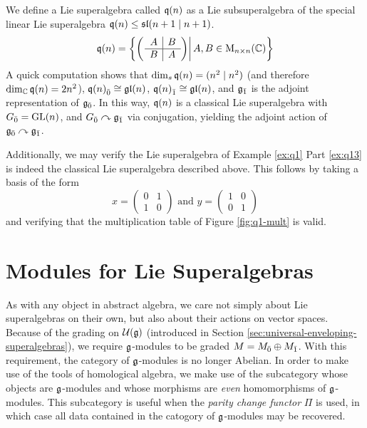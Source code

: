 \begin{example} \label{ex:q(n)}
  We define a Lie superalgebra called $\mathfrak{q}(n)$ as a Lie subsuperalgebra of the special linear Lie superalgebra $\mathfrak{q} (n) \leq \mathfrak{sl}(n+1 \mid n+1)$.
  \[
    \mathfrak{q}(n) =
    \left\{
    \left(
    \left.    
      \begin{array}{c|c}
        A & B \\
        \hline
        B & A
      \end{array}
    \right)
    \right| A,B \in \operatorname{M}_{n \times n}(\mathbb{C})
    \right\}
  \]
  A quick computation shows that $\dim_s \mathfrak{q}(n) = (n^2 \mid n^2)$ (and therefore $\dim_{\mathbb{C}} \mathfrak{q}(n) = 2n^2$), ${\mathfrak{q}(n)}_{\bar{0}} \cong \mathfrak{gl}(n)$, ${\mathfrak{q}(n)}_{\bar{1}} \cong \mathfrak{gl}(n)$, and ${\mathfrak{g}}_{\bar{1}}$ is the adjoint representation of ${\mathfrak{g}}_{\bar{0}}$. In this way, $\mathfrak{q}(n)$ is a classical Lie superalgebra with ${G}_{\bar{0}} = \operatorname{GL}(n)$, and ${G}_{\bar{0}} \curvearrowright {\mathfrak{g}}_{\bar{1}}$ via conjugation, yielding the adjoint action of ${\mathfrak{g}}_{\bar{0}} \curvearrowright {\mathfrak{g}}_{\bar{1}}$.

  Additionally, we may verify the Lie superalgebra of Example \ref{ex:q1} Part \ref{ex:q13} is indeed the classical Lie superalgebra described above. This follows by taking a basis of the form
  \[
    x = 
        \left(
      \begin{array}{c|c}
        0 & 1 \\
        \hline
        1 & 0
      \end{array}
    \right)
    \text{ and }
    y = 
        \left(
      \begin{array}{c|c}
        1 & 0 \\
        \hline
        0 & 1
      \end{array}
    \right)
  \]
  and verifying that the multiplication table of Figure \ref{fig:q1-mult} is valid.
\end{example}


\section{Modules for Lie Superalgebras}
\label{sec:modules}

As with any object in abstract algebra, we care not simply about Lie superalgebras on their own, but also about their actions on vector spaces. Because of the grading on $\mathcal{U}(\mathfrak{g})$ (introduced in Section \ref{sec:universal-enveloping-superalgebras}), we require $\mathfrak{g}$-modules to be graded $M = {M}_{\bar{0}} \oplus {M}_{\bar{1}}$. With this requirement, the category of $\mathfrak{g}$-modules is no longer Abelian. In order to make use of the tools of homological algebra, we make use of the subcategory whose objects are $\mathfrak{g}$-modules and whose morphisms are \emph{even} homomorphisms of $\mathfrak{g}$-modules. This subcategory is useful when the \emph{parity change functor} $\Pi$ is used, in which case all data contained in the catogory of $\mathfrak{g}$-modules may be recovered.

